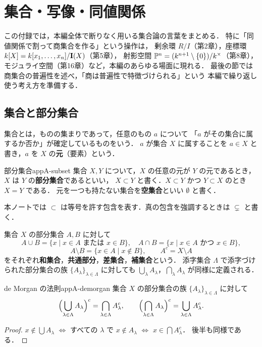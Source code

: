 \chapter{集合・写像・同値関係}\label{app:A}

この付録では，本編全体で断りなく用いる集合論の言葉をまとめる．
特に「同値関係で割って商集合を作る」という操作は，
剰余環 $R/I$（第2章），座標環 $k[X]=k[x_1,\dots,x_n]/\mathbf{I}(X)$（第5章），
射影空間 $\mathbb{P}^n=(k^{n+1}\setminus\{0\})/k^\times$（第8章），
モジュライ空間（第16章）など，本編のあらゆる場面に現れる．
最後の節では商集合の普遍性を述べ，「商は普遍性で特徴づけられる」という
本編で繰り返し使う考え方を準備する．

\section{集合と部分集合}

集合とは，ものの集まりであって，任意のもの $a$ について
「$a$ がその集合に属するか否か」が確定しているものをいう．
$a$ が集合 $X$ に属することを $a\in X$ と書き，$a$ を $X$ の\textbf{元}（要素）という．

\begin{mydef}{部分集合}{appA-subset}
集合 $X,Y$ について，$X$ の任意の元が $Y$ の元であるとき，$X$ は $Y$ の\textbf{部分集合}であるといい，
$X\subset Y$ と書く．$X\subset Y$ かつ $Y\subset X$ のとき $X=Y$ である．
元を一つも持たない集合を\textbf{空集合}といい $\emptyset$ と書く．
\end{mydef}

本ノートでは $\subset$ は等号を許す包含を表す．真の包含を強調するときは $\subsetneq$ と書く．

集合 $X$ の部分集合 $A,B$ に対して
\[
A\cup B=\{x\mid x\in A \text{ または } x\in B\},\quad
A\cap B=\{x\mid x\in A \text{ かつ } x\in B\},
\]
\[
A\setminus B=\{x\in A\mid x\notin B\},\qquad A^c=X\setminus A
\]
をそれぞれ\textbf{和集合}，\textbf{共通部分}，\textbf{差集合}，\textbf{補集合}という．
添字集合 $\Lambda$ で添字づけられた部分集合の族 $\{A_\lambda\}_{\lambda\in\Lambda}$ に対しても
$\bigcup_{\lambda}A_\lambda$，$\bigcap_\lambda A_\lambda$ が同様に定義される．

\begin{myprop}{de Morgan の法則}{appA-demorgan}
集合 $X$ の部分集合の族 $\{A_\lambda\}_{\lambda\in\Lambda}$ に対して
\[
\Bigl(\bigcup_{\lambda\in\Lambda}A_\lambda\Bigr)^c=\bigcap_{\lambda\in\Lambda}A_\lambda^c,\qquad
\Bigl(\bigcap_{\lambda\in\Lambda}A_\lambda\Bigr)^c=\bigcup_{\lambda\in\Lambda}A_\lambda^c .
\]
\end{myprop}
\begin{proof}
$x\notin\bigcup A_\lambda$ $\iff$ すべての $\lambda$ で $x\notin A_\lambda$ $\iff$ $x\in\bigcap A_\lambda^c$．
後半も同様である．
\end{proof}

